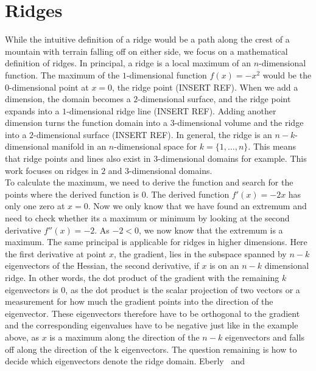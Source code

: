 \section{Ridges}\label{sec:Ridges}

While the intuitive definition of a ridge would be a path along the
crest of a mountain with terrain falling off on either side, we focus on
a mathematical definition of ridges. In principal, a ridge is a local
maximum of an $n$-dimensional function. The maximum of the
$1$-dimensional function $f(x) = -x^2$ would be the $0$-dimensional
point at $x=0$, the ridge point (INSERT REF). When we add a dimension,
the domain becomes a $2$-dimensional surface, and the ridge point
expands into a $1$-dimensional ridge line (INSERT REF). Adding another
dimension turns the function domain into a $3$-dimensional volume and
the ridge into a $2$-dimensional surface (INSERT REF). In general, the
ridge is an $n-k$-dimensional manifold in an $n$-dimensional space for
$k=\{1, \dots, n\}$. This means that ridge points and lines also exist
in $3$-dimensional domains for example. This work focuses on ridges in
$2$ and $3$-dimensional domains.\\
To calculate the maximum, we need to derive the function and search for
the points where the derived function is $0$. The derived function
$f'(x)=-2x$ has only one zero at $x=0$. Now we only know that we have
found an extremum and need to check whether its a maximum or minimum by
looking at the second derivative $f''(x)=-2$. As $-2 < 0$, we now know
that the extremum is a maximum. The same principal is applicable for
ridges in higher dimensions. Here the first derivative at point $x$, the
gradient, lies in the subspace spanned by $n-k$ eigenvectors of the
Hessian, the second derivative, if $x$ is on an $n-k$ dimensional ridge.
In other words, the dot product of the gradient with the remaining $k$
eigenvectors is $0$, as the dot product is the scalar projection of two
vectors or a measurement for how much the gradient points into the
direction of the eigenvector. These eigenvectors therefore have to be
orthogonal to the gradient and the corresponding eigenvalues have to be
negative just like in the example above, as $x$ is a maximum along the
direction of the $n-k$ eigenvectors and falls off along the direction of
the k eigenvectors. The question remaining is how to decide which
eigenvectors denote the ridge domain. Eberly~\cite{Eberly} and
